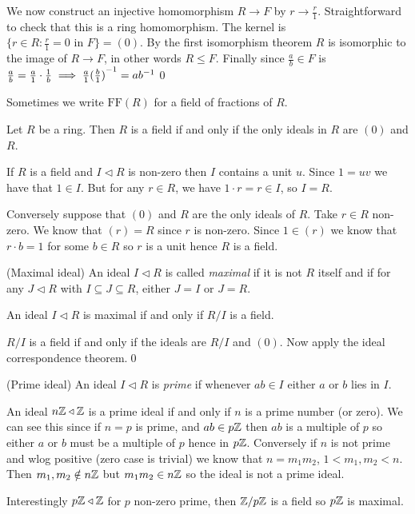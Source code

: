 \documentclass{article}
\newcommand{\nrm}{\triangleleft}
\begin{document}
We now construct an injective homomorphism $ R\to F $ by $ r\to \frac r1 $. Straightforward to check that this is a ring homomorphism. The kernel is $ \{r\in R: \frac r1 = 0 \text { in } F\} =(0)$. By the first isomorphism theorem $ R $ is isomorphic to the image of $ R\to F $, in other words $ R\le F $.
Finally since $ \frac ab\in F $ is $ \frac ab= \frac a1\cdot \frac 1b\implies \frac a1{(\frac b1)}^{-1}=a{b}^{-1} $\qed

Sometimes we write $ \mathrm{FF}(R) $ for a field of fractions of $ R $.
\begin{proposition}
  Let $ R $ be a ring. Then $ R $ is a field if and only if the only ideals in $ R $ are $ (0) $ and $ R $.
\end{proposition}
\pf If $ R $ is a field and $ I\nrm R $ is non-zero then $ I $ contains a unit $ u $. Since $ 1=uv $ we have that $ 1\in I $. But for any $ r\in R $, we have $ 1\cdot r =r\in I $, so $ I=R $.\par
Conversely suppose that $ (0) $ and $ R $ are the only ideals of $ R $. Take $ r\in R $ non-zero. We know that $ (r)=R $ since $ r $ is non-zero. Since $ 1\in (r) $ we know that $ r\cdot b = 1 $ for some $ b\in R $ so $ r $ is a unit hence $ R $ is a field.

\begin{definition}
	(Maximal ideal) An ideal $ I\nrm R $ is called \textit{maximal} if it is not $ R $ itself and if for any $ J\nrm R $ with $ I\subseteq J\subseteq R $, either $ J=I $ or $ J=R $.
\end{definition}

\begin{proposition}
  An ideal $ I\nrm R $ is maximal if and only if $ R/I $ is a field.
\end{proposition}
\pf $ R/I $ is a field if and only if the ideals are $ R/I $ and $ (0) $. Now apply the ideal correspondence theorem.\qed
\begin{definition}
	(Prime ideal) An ideal $ I\nrm R $ is \textit{prime} if whenever $ ab\in I $ either $ a $ or $ b $ lies in $ I $.
\end{definition}
An ideal $ n\Z\nrm \Z $ is a prime ideal if and only if $ n $ is a prime number (or zero). We can see this since if $ n=p $ is prime, and $ ab\in p\mathbb{Z} $ then $ ab $ is a multiple of $ p $ so either $ a $ or $ b $ must be a multiple of $ p $ hence in $ p\mathbb{Z} $. Conversely if $ n $ is not prime and wlog positive (zero case is trivial) we know that $ n=m_1m_2 $, $ 1<m_1,m_2<n $. Then $ m_1,m_2\notin n\mathbb{Z} $ but $ m_1m_2\in n\mathbb{Z} $ so the ideal is not a prime ideal.
\par Interestingly $ p\Z\nrm \Z $ for $ p $ non-zero prime, then $ \mathbb{Z}/p\mathbb{Z} $ is a field so $ p\mathbb{Z} $ is maximal.
\end{document}
